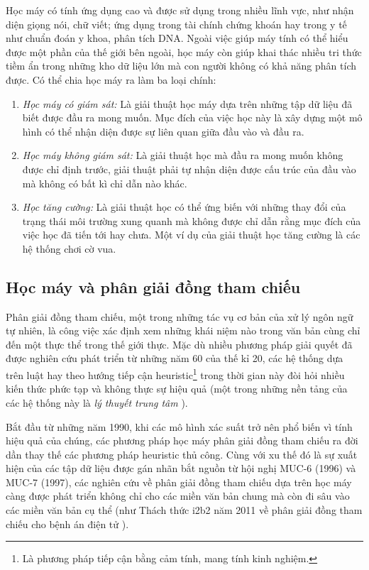 Học máy có tính ứng dụng cao và được sử dụng trong nhiều lĩnh vực, như nhận diện giọng nói, chữ viết; ứng dụng trong tài chính chứng khoán hay trong y tế như chuẩn đoán y khoa, phân tích DNA. Ngoài việc giúp máy tính có thể hiểu được một phần của thế giới bên ngoài, học máy còn giúp khai thác nhiều tri thức tiềm ẩn trong những kho dữ liệu lớn mà con người không có khả năng phân tích được. Có thể chia học máy ra làm ba loại chính:
\begin{enumerate}
\item \emph{Học máy có giám sát:} Là giải thuật học máy dựa trên những tập dữ liệu đã biết được đầu ra mong muốn. Mục đích của việc học này là xây dựng một mô hình có thể nhận diện được sự liên quan giữa đầu vào và đầu ra. 
\item \emph{Học máy không giám sát:} Là giải thuật học mà đầu ra mong muốn không được chỉ định trước, giải thuật phải tự nhận diện được cấu trúc của đầu vào mà không có bất kì chỉ dẫn nào khác.
\item \emph{Học tăng cường:} Là giải thuật học có thể ứng biến với những thay đổi của trạng thái môi trường xung quanh mà không được chỉ dẫn rằng mục đích của việc học đã tiến tới hay chưa. Một ví dụ của giải thuật học tăng cường là các hệ thống chơi cờ vua.
\end{enumerate}

\subsection*{Học máy và phân giải đồng tham chiếu}
Phân giải đồng tham chiếu, một trong những tác vụ cơ bản của xử lý ngôn ngữ tự nhiên, là công việc xác định xem những khái niệm nào trong văn bản cùng chỉ đến một thực thể trong thế giới thực. Mặc dù nhiều phương pháp giải quyết đã được nghiên cứu phát triển từ những năm 60 của thế kỉ 20, các hệ thống dựa trên luật hay theo hướng tiếp cận heuristic\footnote{Là phương pháp tiếp cận bằng cảm tính, mang tính kinh nghiệm.} trong thời gian này đòi hỏi nhiều kiến thức phức tạp và không thực sự hiệu quả (một trong những nền tảng của các hệ thống này là \emph{lý thuyết trung tâm} \cite{Grosz1983}).

Bắt đầu từ những năm 1990, khi các mô hình xác suất trở nên phổ biến vì tính hiệu quả của chúng, các phương pháp học máy phân giải đồng tham chiếu ra đời dần thay thế các phương pháp heuristic thủ công. Cùng với xu thế đó là sự xuất hiện của các tập dữ liệu được gán nhãn bắt nguồn từ hội nghị MUC-6 (1996) và MUC-7 (1997), các nghiên cứu về phân giải đồng tham chiếu dựa trên học máy càng được phát triển không chỉ cho các miền văn bản chung mà còn đi sâu vào các miền văn bản cụ thể (như Thách thức i2b2 năm 2011 về phân giải đồng tham chiếu cho bệnh án điện tử \cite{OzlemUzuner2012}).

